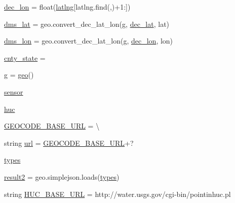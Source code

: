 \begin{DoxyCompactItemize}
\item 
\hyperlink{namespaceget__geo___h_u_c_afbfb5c7891caec4cd76fe21058d6e7ad}{dec\+\_\+lon} = float(\hyperlink{namespaceget__geo___h_u_c_acafcc8295c3d6a0de2fb561809cca132}{latlng}\mbox{[}latlng.\+find(\textquotesingle{},\textquotesingle{})+1\+:\mbox{]})
\item 
\hyperlink{namespaceget__geo___h_u_c_ac22be281ee4954369c420f4045ec3336}{dms\+\_\+lat} = geo.\+convert\+\_\+dec\+\_\+lat\+\_\+lon(\hyperlink{namespaceget__geo___h_u_c_a1619e8221c4336ab1e3f9c06c3481806}{g}, \hyperlink{namespaceget__geo___h_u_c_a299ab467b6f9c8780c7b107ebf7681f3}{dec\+\_\+lat}, \textquotesingle{}lat\textquotesingle{})
\item 
\hyperlink{namespaceget__geo___h_u_c_a3db416386a0a3ae6cf4b30fab0f65118}{dms\+\_\+lon} = geo.\+convert\+\_\+dec\+\_\+lat\+\_\+lon(\hyperlink{namespaceget__geo___h_u_c_a1619e8221c4336ab1e3f9c06c3481806}{g}, \hyperlink{namespaceget__geo___h_u_c_afbfb5c7891caec4cd76fe21058d6e7ad}{dec\+\_\+lon}, \textquotesingle{}lon\textquotesingle{})
\item 
\hyperlink{namespaceget__geo___h_u_c_a522c7169970f8e82ad010316aad9dfb2}{cnty\+\_\+state} = \textquotesingle{}\textquotesingle{}
\item 
\hyperlink{namespaceget__geo___h_u_c_a1619e8221c4336ab1e3f9c06c3481806}{g} = \hyperlink{classget__geo___h_u_c_1_1geo}{geo}()
\item 
\hyperlink{namespaceget__geo___h_u_c_abd10e556b8081f3cd80bff1a987455af}{sensor}
\item 
\hyperlink{namespaceget__geo___h_u_c_ab14c44a4718f2c2eb40b85e71e76a77a}{huc}
\item 
\hyperlink{namespaceget__geo___h_u_c_a7aa1af4577a3ac49f7c1b8ff5e1c88e8}{G\+E\+O\+C\+O\+D\+E\+\_\+\+B\+A\+S\+E\+\_\+\+U\+RL} = \textbackslash{}
\item 
string \hyperlink{namespaceget__geo___h_u_c_ab6098a8720c14d3cf3f34a3301c2ca93}{url} = \hyperlink{namespaceget__geo___h_u_c_a7aa1af4577a3ac49f7c1b8ff5e1c88e8}{G\+E\+O\+C\+O\+D\+E\+\_\+\+B\+A\+S\+E\+\_\+\+U\+RL}+\textquotesingle{}?\textquotesingle{}
\item 
\hyperlink{namespaceget__geo___h_u_c_a55007b40146df8c34c3848a9944800d0}{types}
\item 
\hyperlink{namespaceget__geo___h_u_c_abc778873c4005f461907aeb3d7e5c567}{result2} = geo.\+simplejson.\+loads(\hyperlink{namespaceget__geo___h_u_c_a55007b40146df8c34c3848a9944800d0}{types})
\item 
string \hyperlink{namespaceget__geo___h_u_c_aec26fed42e6a2aa5dd3adef771e80f56}{H\+U\+C\+\_\+\+B\+A\+S\+E\+\_\+\+U\+RL} = \textquotesingle{}http\+://water.\+usgs.\+gov/cgi-\/bin/pointinhuc.\+pl\textquotesingle{}

\end{DoxyCompactItemize}
